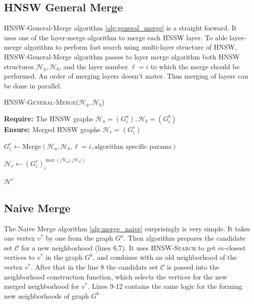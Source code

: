 \documentclass{article}
\begin{document}
\subsection{HNSW General Merge}

HNSW-General-Merge algorithm \ref{alg:general_merge} is a straight forward. It uses one of the layer-merge algorithm to merge each HNSW layer. To able layer-merge algorithm to perform fast search using multi-layer structure of HNSW, HNSW-General-Merge algorithm passes to layer merge algorithm both HNSW structures $\mathcal{H}_a, \mathcal{H}_b$, and the layer number $\ell=i$ to which the merge should be performed. An order of merging layers doesn't mater. Thus merging of layers can be done in parallel.

\begin{algorithm}
\caption{\textsc{HNSW-General-Merge}($\mathcal{H}_a, \mathcal{H}_b$)}\label{alg:general_merge}
\textbf{Require:} The HNSW graphs $\mathcal{H}_a = (G^a_i), \mathcal{H}_b = (G^b_i)$ \\
\textbf{Ensure:}  Merged HNSW graphs $\mathcal{H}_c = (G^c_i)$ 
\begin{algorithmic}[1]

    \State $G^c_i \gets \text{Merge}(\mathcal{H}_a, \mathcal{H}_b, \ell=i, \text{algorithm specific params})$
\EndFor

\State $\mathcal{H}_c \gets (G^c_i)_i^{\max(|\mathcal{H}_a|, |\mathcal{H}_b|)}$

\State \Return $\mathcal{H}^c$
\end{algorithmic}
\end{algorithm}

\subsection{Naive Merge}
The Naive Merge algorithm \ref{alg:merge_naive} surprisingly is very simple. It takes one vertex $v^*$ by one from the graph $G^a$. Then algorithm prepares the candidate set $\mathcal{C}$ for a new neighborhood (lines 6,7). It uses \textsc{HNSW-Search} to get $m$-closest vertices to $v^*$ in the graph $G^b$, and combines with an old neighborhood of the vertex $v^*$. After that in the line 8 the candidate set $\mathcal{C}$ is passed into the neighborhood construction function, which selects the vertices for the new merged neighborhood for $v^*$.
Lines 9-12 contains the same logic for the forming new neighborhoods of graph $G^b$
\end{document}
